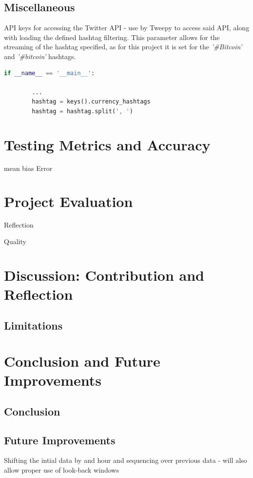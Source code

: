 \documentclass[oneside, 12pt]{article}
\begin{document}
		\subsection{Miscellaneous}
		
		API keys for accessing the Twitter API - use by Tweepy to access said API, along with loading the defined hashtag filtering. This parameter allows for the streaming of the hashtag specified, as for this project it is set for the \textit{'\#Bitcoin'} and \textit{'\#bitcoin'} hashtags.
		\begin{lstlisting}[language=python, caption=keys class - loads API keys for access]
		if __name__ == '__main__':
		
		...
		hashtag = keys().currency_hashtags
		hashtag = hashtag.split(', ')
		\end{lstlisting}	
	\newpage
	
	\section{Testing Metrics and Accuracy}
	mean bias Error
	
	\newpage
	
	\section{Project Evaluation}
	Reflection
	
	Quality
	
	
	\section{Discussion: Contribution and Reflection}
	\subsection{Limitations}
	
	
	\newpage
	
	\section{Conclusion and Future Improvements}
		\subsection{Conclusion}
		\subsection{Future Improvements}
		Shifting the intial data by and hour and sequencing over previous data - will also allow proper use of look-back windows
		
\end{document}
